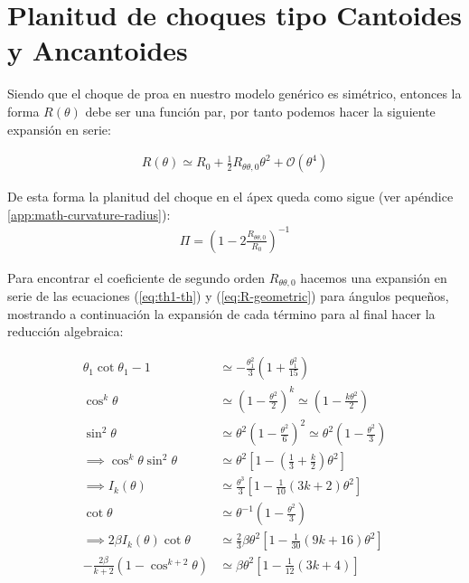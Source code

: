 \section[Planitud]{Planitud de choques tipo Cantoides y Ancantoides}

Siendo que el choque de proa en nuestro modelo genérico es simétrico, entonces la forma $R(\theta)$ debe ser una función par,
por tanto podemos hacer la siguiente expansión en serie:

\begin{align}
  R(\theta) \simeq R_0 + \frac{1}{2}R_{\theta\theta, 0}\theta^2 + \mathcal{O}(\theta^4)
\end{align}

De esta forma la planitud del choque en el ápex queda como sigue (ver apéndice \ref{app:math-curvature-radius}):
\begin{align}
  \Pi = \left(1 - 2\frac{R_{\theta \theta, 0}}{R_0}\right)^{-1}
\end{align}

Para encontrar el coeficiente de segundo orden $R_{\theta \theta, 0}$ hacemos una expansión en serie de las ecuaciones (\ref{eq:th1-th}) y
(\ref{eq:R-geometric}) para ángulos pequeños, mostrando a continuación la expansión de cada término para al final hacer la
reducción algebraica:

\begin{align}
  \theta_1\cot\theta_1 -1 &\simeq -\frac{\theta^2_1}{3}\left(1 + \frac{\theta^2_1}{15}\right) \\
  \cos^k\theta &\simeq \left(1 - \frac{\theta^2}{2}\right)^k \simeq \left(1 - \frac{k\theta^2}{2}\right) \\
  \sin^2\theta &\simeq \theta^2\left(1 - \frac{\theta^2}{6}\right)^2 \simeq \theta^2\left(1 - \frac{\theta^2}{3}\right)\\
  \implies \cos^k\theta\sin^2\theta &\simeq \theta^2\left[1 - \left(\frac{1}{3} + \frac{k}{2}\right)\theta^2\right] \\
  \implies I_k(\theta) &\simeq \frac{\theta^3}{3}\left[1 - \frac{1}{10}\left(3k + 2\right)\theta^2\right] \\
  \cot\theta &\simeq \theta^{-1}\left(1 - \frac{\theta^2}{3}\right) \\
  \implies 2\beta I_k(\theta)\cot\theta &\simeq \frac{2}{3}\beta\theta^2\left[1 - \frac{1}{30}\left(9k + 16\right)\theta^2\right] \\
  -\frac{2\beta}{k+2}\left(1 - \cos^{k+2}\theta\right) &\simeq \beta\theta^2\left[1 - \frac{1}{12}\left(3k+4\right)\right]
\end{align}


